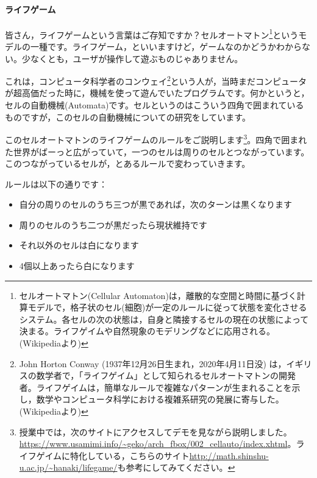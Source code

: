 \documentclass{ltjsbook}
\begin{document}
\paragraph{ライフゲーム}
皆さん，ライフゲームという言葉はご存知ですか？セルオートマトン\footnote{セルオートマトン(Cellular Automaton)は，離散的な空間と時間に基づく計算モデルで，格子状のセル(細胞)が一定のルールに従って状態を変化させるシステム。各セルの次の状態は，自身と隣接するセルの現在の状態によって決まる。ライフゲイムや自然現象のモデリングなどに応用される。(Wikipediaより)}というモデルの一種です。ライフゲーム，といいますけど，ゲームなのかどうかわからない。少なくとも，ユーザが操作して遊ぶものじゃありません。

これは，コンピュータ科学者のコンウェイ\footnote{John Horton Conway (1937年12月26日生まれ，2020年4月11日没) は，イギリスの数学者で，「ライフゲイム」として知られるセルオートマトンの開発者。ライフゲイムは，簡単なルールで複雑なパターンが生まれることを示し，数学やコンピュータ科学における複雑系研究の発展に寄与した。(Wikipediaより)}という人が，当時まだコンピュータが超高価だった時に，機械を使って遊んでいたプログラムです。何かというと，セルの自動機械(Automata)です。セルというのはこういう四角で囲まれているものですが，このセルの自動機械についての研究をしています。

このセルオートマトンのライフゲームのルールをご説明します\footnote{授業中では，次のサイトにアクセスしてデモを見ながら説明しました。\url{https://www.usamimi.info/~geko/arch_fbox/002_cellauto/index.xhtml}。ライフゲイムに特化している，こちらのサイト\url{http://math.shinshu-u.ac.jp/~hanaki/lifegame/}も参考にしてみてください。}。四角で囲まれた世界がばーっと広がっていて，一つのセルは周りのセルとつながっています。このつながっているセルが，とあるルールで変わっていきます。

ルールは以下の通りです：
\begin{itemize}
    \item 自分の周りのセルのうち三つが黒であれば，次のターンは黒くなります
    \item 周りのセルのうち二つが黒だったら現状維持です
    \item それ以外のセルは白になります
    \item 4個以上あったら白になります
\end{itemize}
\end{document}
